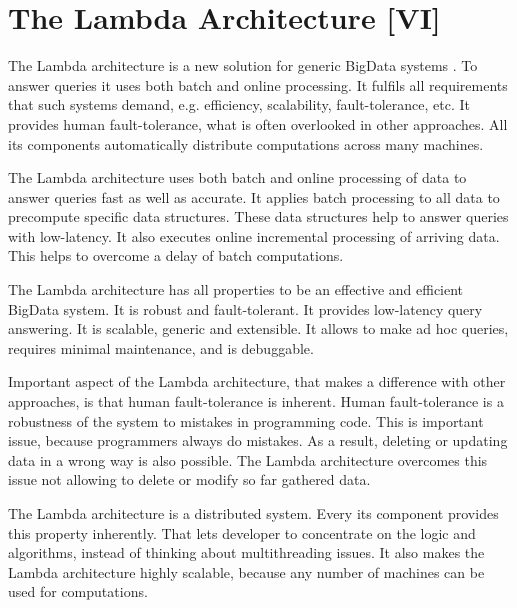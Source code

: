 \chapter{The Lambda Architecture [VI]}
\label{chap:lambda_architecture}


The Lambda architecture is a new solution for generic BigData systems \cite{Marz2014}.
To answer queries it uses both batch and online processing.
It fulfils all requirements that such systems demand, e.g. efficiency, scalability, fault-tolerance, etc.
It provides human fault-tolerance, what is often overlooked in other approaches.
All its components automatically distribute computations across many machines.


The Lambda architecture uses both batch and online processing of data to answer queries fast as well as accurate.
It applies batch processing to all data to precompute specific data structures.
These data structures help to answer queries with low-latency.
It also executes online incremental processing of arriving data.
This helps to overcome a delay of batch computations.

The Lambda architecture has all properties to be an effective and efficient BigData system.
It is robust and fault-tolerant.
It provides low-latency query answering.
It is scalable, generic and extensible.
It allows to make ad hoc queries, requires minimal maintenance, and is debuggable.

Important aspect of the Lambda architecture, that makes a difference with other approaches, is that human fault-tolerance is inherent.
Human fault-tolerance is a robustness of the system to mistakes in programming code.
This is important issue, because programmers always do mistakes.
As a result, deleting or updating data in a wrong way is also possible.
The Lambda architecture overcomes this issue not allowing to delete or modify so far gathered data.

The Lambda architecture is a distributed system.
Every its component provides this property inherently.
That lets developer to concentrate on the logic and algorithms, instead of thinking about multithreading issues.
It also makes the Lambda architecture highly scalable, because any number of machines can be used for computations.





